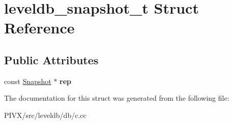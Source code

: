 \hypertarget{structleveldb__snapshot__t}{}\section{leveldb\+\_\+snapshot\+\_\+t Struct Reference}
\label{structleveldb__snapshot__t}
\subsection*{Public Attributes}
\begin{DoxyCompactItemize}
\item 
\mbox{\label{structleveldb__snapshot__t_a36f57ffdcd88fa73322d8e2e637e3b6a}} 
const \mbox{\hyperlink{classleveldb_1_1_snapshot}{Snapshot}} $\ast$ {\bfseries rep}
\end{DoxyCompactItemize}


The documentation for this struct was generated from the following file\+:\begin{DoxyCompactItemize}
\item 
P\+I\+V\+X/src/leveldb/db/c.\+cc\end{DoxyCompactItemize}

